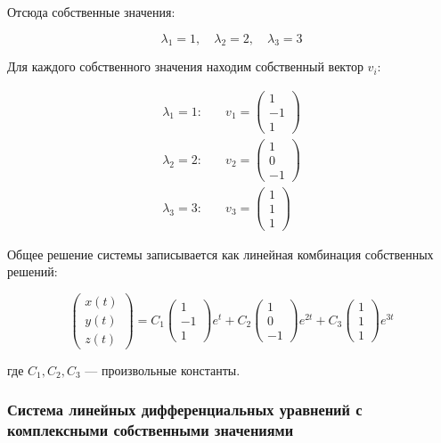 Отсюда собственные значения:

\begin{equation*}
    \lambda_1 = 1, \quad \lambda_2 = 2, \quad \lambda_3 = 3
\end{equation*}

Для каждого собственного значения находим собственный вектор \(v_i\):

\begin{align*}
    \lambda_1 = 1: & \quad v_1 = \begin{pmatrix} 1 \\ -1 \\ 1 \end{pmatrix} \\
    \lambda_2 = 2: & \quad v_2 = \begin{pmatrix} 1 \\ 0 \\ -1 \end{pmatrix} \\
    \lambda_3 = 3: & \quad v_3 = \begin{pmatrix} 1 \\ 1 \\ 1 \end{pmatrix}
\end{align*}

Общее решение системы записывается как линейная комбинация собственных решений:

\begin{equation*}
    \begin{pmatrix} x(t) \\ y(t) \\ z(t) \end{pmatrix} =
    C_1
    \begin{pmatrix} 1 \\ -1 \\ 1 \end{pmatrix} e^{t} +
    C_2
    \begin{pmatrix} 1 \\ 0 \\ -1 \end{pmatrix} e^{2t} +
    C_3
    \begin{pmatrix} 1 \\ 1 \\ 1 \end{pmatrix} e^{3t}
\end{equation*}

где \(C_1, C_2, C_3\) — произвольные константы.

\subsubsection{Система линейных дифференциальных уравнений с комплексными собственными значениями}


